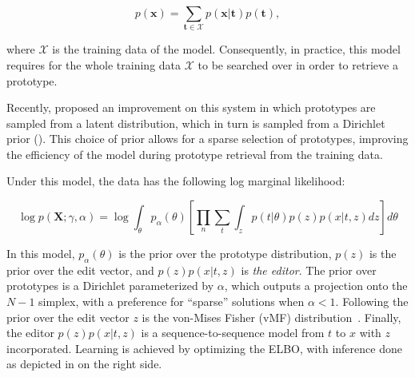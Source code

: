 \begin{equation}
    p(\bm{x}) = \sum_{\bm{t} \in \mathcal{X}} p(\bm{x} | \bm{t}) p(\bm{t}),
\end{equation}

\noindent where $\mathcal{X}$ is the training data of the model.
Consequently, in practice, this model requires for the whole training
data $\mathcal{X}$ to be searched over in order to retrieve a
prototype.

Recently, \citet{he2020LearningSparsePrototypes} proposed an
improvement on this system in which prototypes are sampled from a
latent distribution, which in turn is sampled from a Dirichlet prior
(). This choice of prior
allows for a sparse selection of prototypes, improving the efficiency
of the model during prototype retrieval from the training data.

Under this model, the data has the following log marginal likelihood:

\begin{equation}
    \log p(\bm{X} ; \gamma, \alpha) =
    \log \int_\theta p_\alpha (\theta)
    \left[ \prod_n \sum_{t} \int_{z}
        p(t | \theta) p(z) p(x | t, z)
        dz \right] d\theta
\end{equation}

In this model, $p_\alpha(\theta)$ is the prior over the prototype
distribution, $p(z)$ is the prior over the edit vector, and
$p(z) p(x | t, z)$ is {\it the editor}.
The prior over prototypes is a Dirichlet parameterized by $\alpha$,
which outputs a projection onto the $N-1$ simplex, with a preference
for ``sparse'' solutions when $\alpha<1$. Following
\citet{guu2018GeneratingSentencesEditing} the prior over the edit
vector $z$ is the von-Mises Fisher (vMF)
distribution~\citep{s-vae18}. Finally, the editor
$p(z) p(x | t, z)$ is a
sequence-to-sequence model from $t$ to $x$ with
$z$ incorporated. Learning is achieved by optimizing the ELBO,
with inference done as depicted in
 on the right side.

